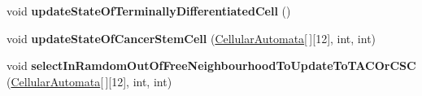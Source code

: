 \begin{DoxyCompactItemize}
\item 
\hypertarget{class_cellular_automata_af2d299cdc39ae67504c8fe767a3c51cd}{}void {\bfseries update\+State\+Of\+Terminally\+Differentiated\+Cell} ()\label{class_cellular_automata_af2d299cdc39ae67504c8fe767a3c51cd}

\item 
\hypertarget{class_cellular_automata_aac637f629ee83cc9c9b0b5348db9fe89}{}void {\bfseries update\+State\+Of\+Cancer\+Stem\+Cell} (\hyperlink{class_cellular_automata}{Cellular\+Automata}\mbox{[}$\,$\mbox{]}\mbox{[}12\mbox{]}, int, int)\label{class_cellular_automata_aac637f629ee83cc9c9b0b5348db9fe89}

\item 
\hypertarget{class_cellular_automata_a2b00f7f0b2fc0c8c9c69864c2fb0cc4d}{}void {\bfseries select\+In\+Ramdom\+Out\+Of\+Free\+Neighbourhood\+To\+Update\+To\+T\+A\+C\+Or\+C\+S\+C} (\hyperlink{class_cellular_automata}{Cellular\+Automata}\mbox{[}$\,$\mbox{]}\mbox{[}12\mbox{]}, int, int)\label{class_cellular_automata_a2b00f7f0b2fc0c8c9c69864c2fb0cc4d}

\end{DoxyCompactItemize}
